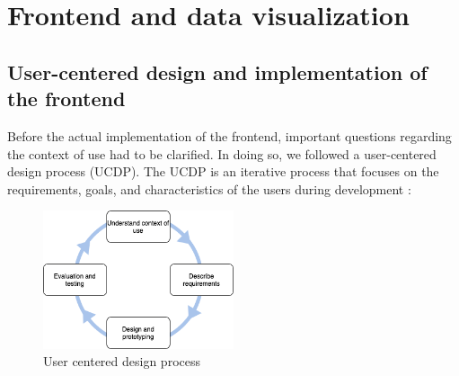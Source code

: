 \documentclass[
    fontsize=12pt,
    headings=small,
    parskip=half,           %
    bibliography=totoc,
    numbers=noenddot,       %
    open=any,               %
    ]{scrreprt}
\begin{document}
\section{Frontend and data visualization}

\subsection{User-centered design and implementation of the frontend}
Before the actual implementation of the frontend, important questions regarding the context of use had to be clarified. In doing so, we followed a user-centered design process (UCDP). The UCDP is an iterative process that focuses on the requirements, goals, and characteristics of the users during development \cite{abras2004user}:

\begin{figure}[h]
    \centering
    \includegraphics[width=0.5\textwidth]{pic/UCDP_English.png}
    \caption{User centered design process \cite{norman2013}}
    \label{fig:my_label}
\end{figure}
\end{document}
